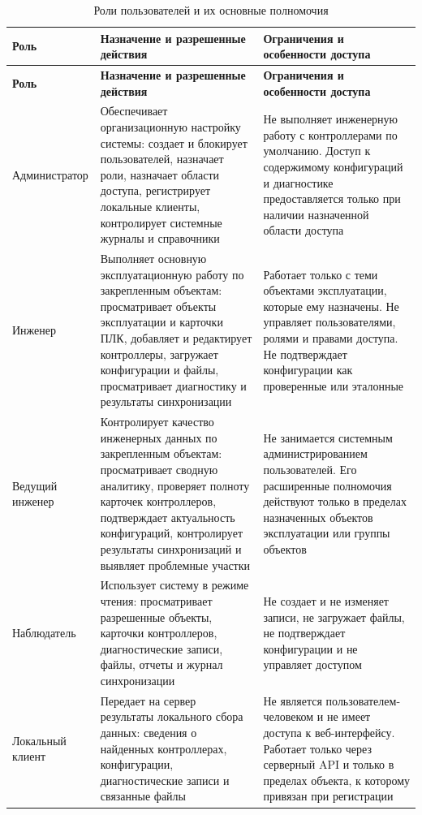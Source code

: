 \small
\begin{longtable}{|p{}|p{}|p{}|}
	\caption{Роли пользователей и их основные полномочия} \label{tab:roles_permissions} \\
	\hline
	\textbf{Роль} & \textbf{Назначение и разрешенные действия} & \textbf{Ограничения и особенности доступа} \\ \hline
	\endfirsthead
	\tabcont{\ref{tab:roles_permissions}}
	\textbf{Роль} & \textbf{Назначение и разрешенные действия} & \textbf{Ограничения и особенности доступа} \\ \hline
	\endhead
	\hline
	\endfoot
	\hline
	\endlastfoot
	
	Администратор & Обеспечивает организационную настройку системы: создает и блокирует пользователей, назначает роли, назначает области доступа, регистрирует локальные клиенты, контролирует системные журналы и справочники & Не выполняет инженерную работу с контроллерами по умолчанию. Доступ к содержимому конфигураций и диагностике предоставляется только при наличии назначенной области доступа \\ \hline
	
	Инженер & Выполняет основную эксплуатационную работу по закрепленным объектам: просматривает объекты эксплуатации и карточки ПЛК, добавляет и редактирует контроллеры, загружает конфигурации и файлы, просматривает диагностику и результаты синхронизации & Работает только с теми объектами эксплуатации, которые ему назначены. Не управляет пользователями, ролями и правами доступа. Не подтверждает конфигурации как проверенные или эталонные \\ \hline
	
	Ведущий инженер & Контролирует качество инженерных данных по закрепленным объектам: просматривает сводную аналитику, проверяет полноту карточек контроллеров, подтверждает актуальность конфигураций, контролирует результаты синхронизаций и выявляет проблемные участки & Не занимается системным администрированием пользователей. Его расширенные полномочия действуют только в пределах назначенных объектов эксплуатации или группы объектов \\ \hline
	
	Наблюдатель & Использует систему в режиме чтения: просматривает разрешенные объекты, карточки контроллеров, диагностические записи, файлы, отчеты и журнал синхронизации & Не создает и не изменяет записи, не загружает файлы, не подтверждает конфигурации и не управляет доступом \\ \hline
	
	Локальный клиент & Передает на сервер результаты локального сбора данных: сведения о найденных контроллерах, конфигурации, диагностические записи и связанные файлы & Не является пользователем-человеком и не имеет доступа к веб-интерфейсу. Работает только через серверный API и только в пределах объекта, к которому привязан при регистрации \\ \hline
\end{longtable}
\normalsize

